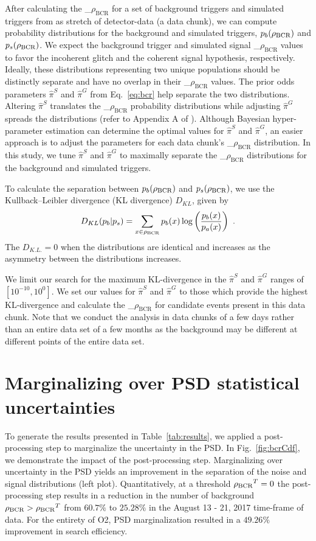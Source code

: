 \documentclass[
 nofootinbib,
 amsmath,amssymb,
 aps,
 twocolumn,
 superscriptaddress
]{revtex4-2}
\newcommand{\mathcmd}[1]{{\sc \relax\ifmmode#1\else $#1$\fi}\xspace}
\newcommand{\bcr}{\mathcmd{\rho_\text{BCR}}}
\begin{document}
After calculating the \bcr for a set of background triggers and simulated triggers from as stretch of detector-data (a data chunk), we can compute probability distributions for the background and simulated triggers, $p_b(\bcr)$ and $p_s(\bcr)$. We expect the background trigger and simulated signal \bcr values to favor the incoherent glitch and the coherent signal hypothesis, respectively. Ideally, these distributions representing two unique populations should be distinctly separate and have no overlap in their \bcr values. The prior odds parameters $\hat{\pi}^S$ and $\hat{\pi}^G$ from Eq.~\ref{eq:bcr} help separate the two distributions. Altering $\hat{\pi}^S$ translates the \bcr probability distributions while adjusting $\hat{\pi}^G$ spreads the distributions (refer to Appendix A of \citet{BCR1}). Although Bayesian hyper-parameter estimation can determine the optimal values for $\hat{\pi}^S$ and $\hat{\pi}^G$, an easier approach is to adjust the parameters for each data chunk's \bcr distribution. In this study, we tune $\hat{\pi}^S$ and $\hat{\pi}^G$ to maximally separate the \bcr distributions for the background and simulated triggers. 

To calculate the separation between $p_b(\bcr)$ and $p_s(\bcr)$, we use the Kullback--Leibler divergence (KL divergence) $D_{KL}$, given by
\begin{equation}
    D_{KL}(p_b | p_s) = \sum\limits_{x\in \bcr} p_b(x) \log \left( \frac{p_b(x)}{p_a(x)} \right)  \ .
\end{equation}
The $D_{K.L.}=0$ when the distributions are identical and increases as the asymmetry between the distributions increases. 

We limit our search for the maximum KL-divergence in the $\hat{\pi}^S$ and $\hat{\pi}^G$ ranges of $[10^{-10}, 10^0]$. We set our values for $\hat{\pi}^S$ and $\hat{\pi}^G$ to those which provide the highest KL-divergence and calculate the \bcr for candidate events present in this data chunk. Note that we conduct the analysis in data chunks of a few days rather than an entire data set of a few months as the background may be different at different points of the entire data set.






\section{Marginalizing over PSD statistical uncertainties}\label{sec:psd-marginalization}
To generate the results presented in Table~\ref{tab:results}, we applied a post-processing step to marginalize the uncertainty in the PSD. In Fig.~\ref{fig:bcrCdf}, we demonstrate the impact of the post-processing step. Marginalizing over uncertainty in the PSD yields an improvement in the separation of the noise and signal distributions (left plot). Quantitatively, at a threshold $\bcr^T=0$ the post-processing step results in a reduction in the number of background $\bcr > \bcr^T$ from $60.7\%$ to $25.28\%$ in the August 13 - 21, 2017 time-frame of data. For the entirety of O2, PSD marginalization resulted in a $49.26\%$ improvement in search efficiency. 
\end{document}
